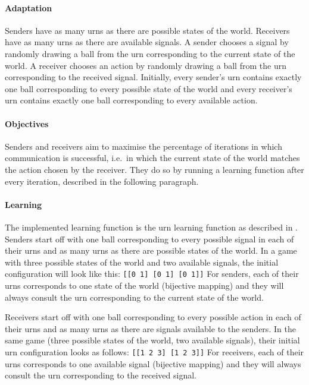 \documentclass[
	DIV=calc,
	BCOR=0mm,
	pagesize,
	titlepage
]{scrartcl}
\newcommand{\code}[1]{\texttt{#1}}
\begin{document}
\paragraph{Adaptation}
Senders have as many urns as there are possible states of the world.
Receivers have as many urns as there are available signals.
A sender chooses a signal by randomly drawing a ball from the urn corresponding to the current state of the world.
A receiver chooses an action by randomly drawing a ball from the urn corresponding to the received signal.
Initially, every sender's urn contains exactly one ball corresponding to every possible state of the world and every receiver's urn contains exactly one ball corresponding to every available action.

\paragraph{Objectives}
Senders and receivers aim to maximise the percentage of iterations in which communication is successful, i.e.~in which the current state of the world matches the action chosen by the receiver.
They do so by running a learning function after every iteration, described in the following paragraph.

\paragraph{Learning}
The implemented learning function is the urn learning function as described in \citet[sec.~2, unpaginated preprint]{barrett_numerical_2006}.
Senders start off with one ball corresponding to every possible signal in each of their urns and as many urns as there are possible states of the world.
In a game with three possible states of the world and two available signals, the initial configuration will look like this: \code{[[0 1] [0 1] [0 1]]}
For senders, each of their urns corresponds to one state of the world (bijective mapping) and they will always consult the urn corresponding to the current state of the world.

Receivers start off with one ball corresponding to every possible action in each of their urns and as many urns as there are signals available to the senders.
In the same game (three possible states of the world, two available signals), their initial urn configuration looks as follows: \code{[[1 2 3] [1 2 3]]}
For receivers, each of their urns corresponds to one available signal (bijective mapping) and they will always consult the urn corresponding to the received signal.
\end{document}
